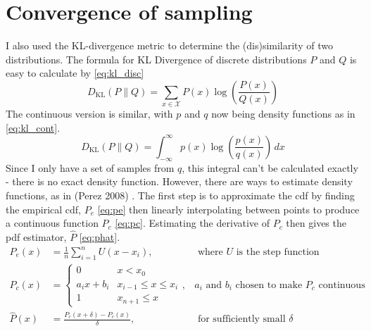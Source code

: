 \FloatBarrier
						
\section{Convergence of sampling}
I also used the KL-divergence metric to determine the (dis)similarity of two distributions. The formula for KL Divergence of discrete distributions $P$ and $Q$ is easy to calculate by \eqref{eq:kl_disc}
% 
\begin{equation} \label{eq:kl_disc}
	{D_{\text{KL}}(P\parallel Q)=\sum _{x\in {\mathcal {X}}}P(x)\log \left({\frac {P(x)}{Q(x)}}\right)} 
\end{equation} 
% 
The continuous version is similar, with $p$ and $q$ now being density functions as in \eqref{eq:kl_cont}. 
% 
\begin{equation} \label{eq:kl_cont}	
	{D_\text{KL}}(P\parallel Q)=\int _{-\infty }^{\infty }p(x)\log \left({\frac {p(x)}{q(x)}}\right)\,dx
\end{equation} 
% 
Since I only have a set of samples from $q$, this integral can't be calculated exactly - there is no exact density function. However, there are ways to estimate density functions, as in (Perez 2008) \cite{perez2008kullback}. The first step is to approximate the cdf by finding the empirical cdf, $P_e$ \eqref{eq:pe} then linearly interpolating between points to produce a continuous function $P_c$ \eqref{eq:pc}. Estimating the derivative of $P_c$ then gives the pdf estimator, $\hat{P}$ \eqref{eq:phat}. 
% 
\begin{align}
	P_e(x)     & = \frac1{n}\sum_{i=1}^n U(x-x_i) ,        & \text{ where $U$ is the step function}\label{eq:pe}    \\ 
	P_c(x)     & = \begin{cases}                                                                                
	0          & x<x_0                                                                                          \\
	a_ix+b_i   & x_{i-1} \leq x \le x_i                                                                         \\
	1          & x_{n+1} \leq x                                                                                 
	\end{cases} \label{eq:pc} ,& \text{$a_i$ and $b_i$ chosen to make $P_c$ continuous }\\ 
	\hat{P}(x) & = \frac{P_c(x+\delta) - P_c(x)}{\delta} , & \text{ for sufficiently small }\delta  \label{eq:phat} 
\end{align}
